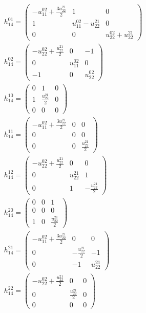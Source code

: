 \documentclass[a4paper, 11pt, twoside, onecolumn]{article}
\begin{document}
\begin{landscape}
\begin{gather*}
	 h_{14}^{01}=\begin{pmatrix}- u^{02}_{11} + \frac{3 u^{21}_{22}}{2} & 1 & 0\\1 & u^{02}_{11} - u^{21}_{22} & 0\\0 & 0 & u^{02}_{22} + u^{21}_{22}\end{pmatrix}\\ 
	 h_{14}^{02}=\begin{pmatrix}- u^{02}_{22} + \frac{u^{21}_{22}}{2} & 0 & -1\\0 & u^{02}_{11} & 0\\-1 & 0 & u^{02}_{22}\end{pmatrix}\\ 
	 h_{14}^{10}=\begin{pmatrix}0 & 1 & 0\\1 & \frac{u^{21}_{22}}{2} & 0\\0 & 0 & 0\end{pmatrix}\\ 
	 h_{14}^{11}=\begin{pmatrix}- u^{02}_{11} + \frac{3 u^{21}_{22}}{2} & 0 & 0\\0 & 0 & 0\\0 & 0 & \frac{u^{21}_{22}}{2}\end{pmatrix}\\ 
	 h_{14}^{12}=\begin{pmatrix}- u^{02}_{22} + \frac{u^{21}_{22}}{2} & 0 & 0\\0 & u^{21}_{22} & 1\\0 & 1 & - \frac{u^{21}_{22}}{2}\end{pmatrix}\\ 
	 h_{14}^{20}=\begin{pmatrix}0 & 0 & 1\\0 & 0 & 0\\1 & 0 & \frac{u^{21}_{22}}{2}\end{pmatrix}\\ 
	 h_{14}^{21}=\begin{pmatrix}- u^{02}_{11} + \frac{3 u^{21}_{22}}{2} & 0 & 0\\0 & - \frac{u^{21}_{22}}{2} & -1\\0 & -1 & u^{21}_{22}\end{pmatrix}\\ 
	 h_{14}^{22}=\begin{pmatrix}- u^{02}_{22} + \frac{u^{21}_{22}}{2} & 0 & 0\\0 & \frac{u^{21}_{22}}{2} & 0\\0 & 0 & 0\end{pmatrix}\\ 

\end{gather*}
\end{landscape}
\end{document}
